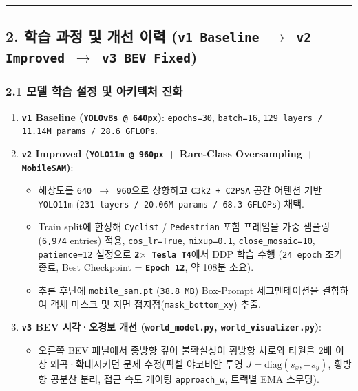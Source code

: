 \documentclass[10.5pt,a4paper]{article}
\begin{document}
\par\noindent\rule{\textwidth}{0.4pt}\par\medskip

\subsection{2. 학습 과정 및 개선 이력 (\texttt{v1 Baseline $\rightarrow$ v2 Improved $\rightarrow$ v3 BEV Fixed})}

\subsubsection{2.1 모델 학습 설정 및 아키텍처 진화}
\begin{enumerate}[leftmargin=1.8em,itemsep=2pt]
\item \textbf{\texttt{v1} Baseline (\texttt{YOLOv8s @ 640px})}: \texttt{epochs=30}, \texttt{batch=16}, \texttt{129 layers /\allowbreak{} 11.\allowbreak{}14M params /\allowbreak{} 28.\allowbreak{}6 GFLOPs}.
\item \textbf{\texttt{v2} Improved (\texttt{YOLO11m @ 960px} + Rare-Class Oversampling + \texttt{MobileSAM})}:
\begin{itemize}[leftmargin=1.5em,itemsep=2pt]
\item 해상도를 \texttt{640 $\rightarrow$ 960}으로 상향하고 \texttt{C3k2 + C2PSA} 공간 어텐션 기반 \texttt{YOLO11m} (\texttt{231 layers /\allowbreak{} 20.\allowbreak{}06M params /\allowbreak{} 68.\allowbreak{}3 GFLOPs}) 채택.
\item Train split에 한정해 \texttt{Cyclist} / \texttt{Pedestrian} 포함 프레임을 가중 샘플링(\texttt{6,\allowbreak{}974} entries) 적용, \texttt{cos\_\allowbreak{}lr=True}, \texttt{mixup=0.\allowbreak{}1}, \texttt{close\_\allowbreak{}mosaic=10}, \texttt{patience=12} 설정으로 \textbf{\texttt{2$\times$ Tesla T4}}에서 DDP 학습 수행 (\texttt{24 epoch} 조기 종료, Best Checkpoint = \textbf{\texttt{Epoch 12}}, 약 108분 소요).
\item 추론 후단에 \texttt{mobile\_\allowbreak{}sam.\allowbreak{}pt} (\texttt{38.\allowbreak{}8 MB}) Box-Prompt 세그멘테이션을 결합하여 객체 마스크 및 지면 접지점(\texttt{mask\_\allowbreak{}bottom\_\allowbreak{}xy}) 추출.
\end{itemize}
\item \textbf{\texttt{v3} BEV 시각·오경보 개선 (\texttt{world\_\allowbreak{}model.\allowbreak{}py}, \texttt{world\_\allowbreak{}visualizer.\allowbreak{}py})}:
\begin{itemize}[leftmargin=1.5em,itemsep=2pt]
\item 오른쪽 BEV 패널에서 종방향 깊이 불확실성이 횡방향 차로와 타원을 2배 이상 왜곡·확대시키던 문제 수정(픽셀 야코비안 투영 $J=\text{diag}(s_x,-s_y)$, 횡방향 공분산 분리, 접근 속도 게이팅 \texttt{approach\_\allowbreak{}w}, 트랙별 EMA 스무딩).
\end{itemize}
\end{enumerate}
\end{document}
